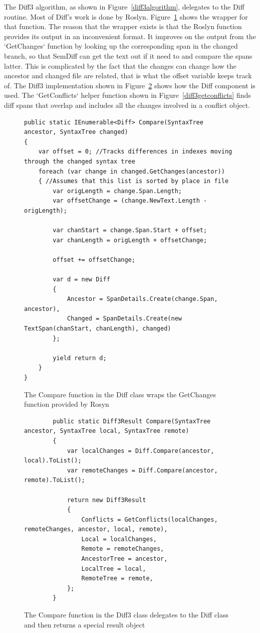 \documentclass[draftclsnofoot,onecolumn]{IEEEtran}
\begin{document}
The Diff3 algorithm, as shown in Figure~\ref{diff3algorithm}, delegates to 
the Diff routine. Most of Diff’s work is done by Roslyn. 
Figure~\ref{diffcompare} shows the wrapper for that function. The reason 
that the wrapper exists is that the Roslyn function provides its output in 
an inconvenient format. It improves on the output from the `GetChanges` 
function by looking up the corresponding span in the changed branch, so that 
SemDiff can get the text out if it need to and compare the spans latter. 
This is complicated by the fact that the changes can change how the ancestor 
and changed file are related, that is what the offset variable keeps track 
of. The Diff3 implementation shown in Figure~\ref{diff3compare} shows how 
the Diff component is used. The `GetConflicts` helper function shown in 
Figure~\ref{diff3getconflicts} finds diff spans that overlap and includes 
all the changes involved in a conflict object.

\begin{figure}[!t]
\centering
\begin{lstlisting}
public static IEnumerable<Diff> Compare(SyntaxTree ancestor, SyntaxTree changed)
{
    var offset = 0; //Tracks differences in indexes moving through the changed syntax tree
    foreach (var change in changed.GetChanges(ancestor))
    { //Assumes that this list is sorted by place in file
        var origLength = change.Span.Length;
        var offsetChange = (change.NewText.Length - origLength);

        var chanStart = change.Span.Start + offset;
        var chanLength = origLength + offsetChange;

        offset += offsetChange;

        var d = new Diff
        {
            Ancestor = SpanDetails.Create(change.Span, ancestor),
            Changed = SpanDetails.Create(new TextSpan(chanStart, chanLength), changed)
        };

        yield return d;
    }
}
\end{lstlisting}
\caption{The Compare function in the Diff class wraps the GetChanges 
function provided by Rosyn}
\label{diffcompare}
\end{figure}

\begin{figure}[!t]
\centering
\begin{lstlisting}
        public static Diff3Result Compare(SyntaxTree ancestor, SyntaxTree local, SyntaxTree remote)
        {
            var localChanges = Diff.Compare(ancestor, local).ToList();
            var remoteChanges = Diff.Compare(ancestor, remote).ToList();

            return new Diff3Result
            {
                Conflicts = GetConflicts(localChanges, remoteChanges, ancestor, local, remote),
                Local = localChanges,
                Remote = remoteChanges,
                AncestorTree = ancestor,
                LocalTree = local,
                RemoteTree = remote,
            };
        }
\end{lstlisting}
\caption{The Compare function in the Diff3 class delegates to the Diff class and then returns a special result object}
\label{diff3compare}
\end{figure}
\end{document}
